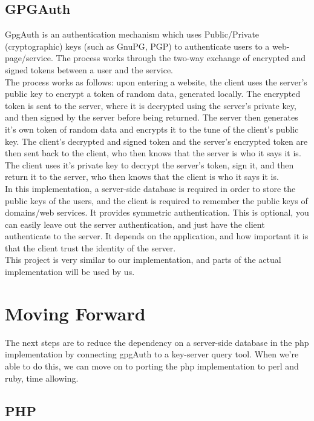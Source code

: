 \documentclass[11pt]{article}
\begin{document}
\subsection{GPGAuth} \label{subsec:gpgauth}
GpgAuth\cite{gpgauth} is an authentication mechanism which uses Public/Private (cryptographic) keys (such as GnuPG, PGP) to authenticate users to a web-page/service.  The process works through the two-way exchange of encrypted and signed tokens between a user and the service.\\
	The process works as follows: upon entering a website, the client uses the server's public key to encrypt a token of random data, generated locally.  The encrypted token is sent to the server, where it is decrypted using the server's private key, and then signed by the server before being returned.  The server then generates it's own token of random data and encrypts it to the tune of the client's public key.  The client's decrypted and signed token  and the server's encrypted token are then sent back to the client, who then knows that the server is who it says it is.  The client uses it's private key to decrypt the server's token, sign it, and then return it to the server, who then knows that the client is who it says it is.\\
	In this implementation, a server-side database is required in order to store the public keys of the users, and the client is required to remember the public keys of domains/web services. It provides symmetric authentication. This is optional, you can easily leave out the server authentication, and just have the client authenticate to the server. It depends on the application, and how important it is that the client trust the identity of the server.\\
	This project is very similar to our implementation, and parts of the actual implementation will be used by us.

\section{Moving Forward} \label{sec:future}
The next steps are to reduce the dependency on a server-side database in the php implementation by connecting gpgAuth to a key-server query tool.  When we're able to do this, we can move on to porting the php implementation to perl and ruby, time allowing.  

\subsection{PHP} \label{subsec:php}

{}
\end{document}
